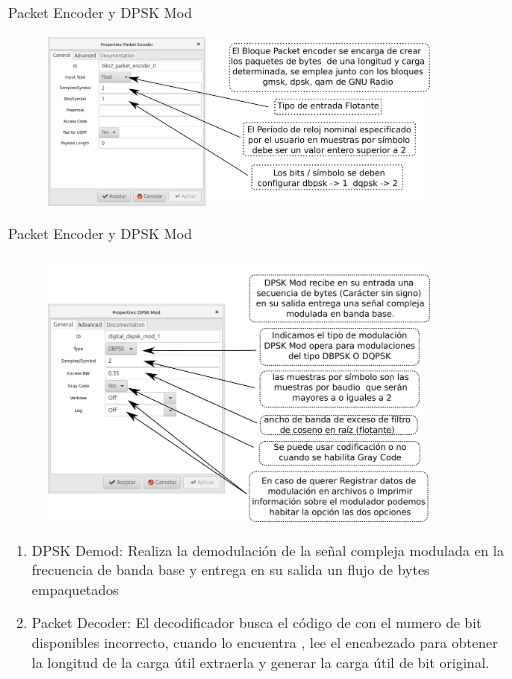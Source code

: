 \begin{frame}{Packet Encoder y DPSK Mod}
\begin{figure}[H]
	\vspace{-3mm}
	\centering
	\includegraphics[width=0.9\textwidth]{Modulaciones_digitales/lab18/pdf/02Packet_Encoder.pdf}
\end{figure}
\end{frame}

\begin{frame}{Packet Encoder y DPSK Mod}
\begin{figure}[H]
	\vspace{-3mm}
	\centering
	\includegraphics[width=0.9\textwidth]{Modulaciones_digitales/lab18/pdf/03DPSK_Mod.pdf}
\end{figure}
\end{frame}

	\begin{frame}
	\begin{enumerate}[1.]
	\frametitle{\underline{\textbf{Demodulación y Decodificación DPSK}}}
	\item{DPSK Demod: 
Realiza la demodulación de la señal compleja modulada en la frecuencia de banda base y entrega en su salida un flujo de bytes empaquetados }\\
	\item{Packet Decoder: El decodificador busca el código de  con el numero de bit disponibles incorrecto, cuando lo encuentra , lee el encabezado para obtener la longitud de la carga útil extraerla y generar la carga útil de bit original.}\\
	\end{enumerate}
	\end{frame}
	
